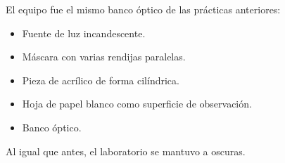 El equipo fue el mismo banco óptico de las prácticas anteriores:
\begin{itemize}
\item Fuente de luz incandescente.
\item Máscara con varias rendijas paralelas.
\item Pieza de acrílico de forma cilíndrica.
\item Hoja de papel blanco como superficie de observación.
\item Banco óptico.
\end{itemize}
Al igual que antes, el laboratorio se mantuvo a oscuras.
